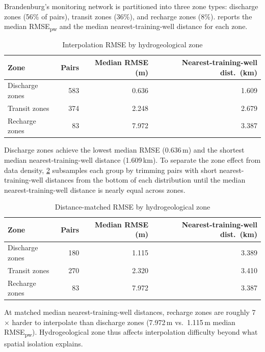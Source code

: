 Brandenburg's monitoring network is partitioned into three zone types: discharge zones
(56\% of pairs), transit zones (36\%), and recharge zones (8\%).
 reports the median RMSE\textsubscript{pw} and the median
nearest-training-well distance for each zone.

\begin{table}[htbp]
\centering
\begin{tabular}{lrrr}
\toprule
\textbf{Zone} & \textbf{Pairs} & \textbf{Median RMSE (m)} & \textbf{Nearest-training-well dist.\ (km)} \\
\midrule
Discharge zones & 583 & 0.636 & 1.609 \\
Transit zones   & 374 & 2.248 & 2.679 \\
Recharge zones  &  83 & 7.972 & 3.387 \\
\bottomrule
\end{tabular}
\caption{Interpolation RMSE by hydrogeological zone}
\label{tab:hydroraum_breakdown}
\end{table}

Discharge zones achieve the lowest median RMSE (0.636\,m) and the shortest median
nearest-training-well distance (1.609\,km). To separate the zone effect from data density,
\cref{tab:hydroraum_dist_matched} subsamples each group by trimming pairs with short nearest-training-well
distances from the bottom of each distribution until the median nearest-training-well distance is nearly equal across zones.

\begin{table}[htbp]
\centering
\begin{tabular}{lrrr}
\toprule
\textbf{Zone} & \textbf{Pairs} & \textbf{Median RMSE (m)} & \textbf{Nearest-training-well dist.\ (km)} \\
\midrule
Discharge zones & 180 & 1.115 & 3.389 \\
Transit zones   & 270 & 2.320 & 3.410 \\
Recharge zones  &  83 & 7.972 & 3.387 \\
\bottomrule
\end{tabular}
\caption{Distance-matched RMSE by hydrogeological zone}
\label{tab:hydroraum_dist_matched}
\end{table}

At matched median nearest-training-well distances, recharge zones are roughly 7$\times$ harder to interpolate
than discharge zones (7.972\,m vs.\ 1.115\,m median RMSE\textsubscript{pw}). Hydrogeological zone thus affects interpolation difficulty beyond what spatial isolation explains.

